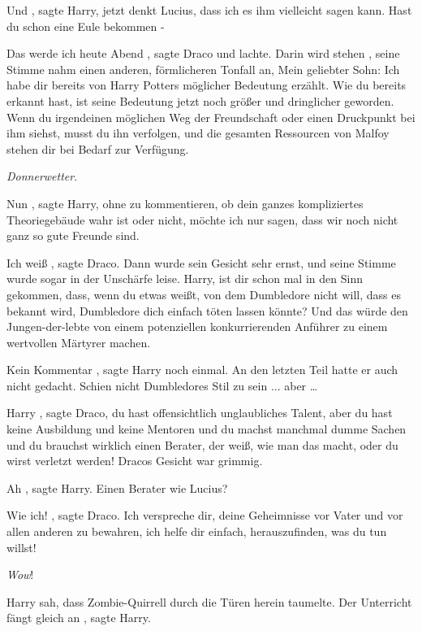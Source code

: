 \glqq Und\grqq{} , sagte Harry, \glqq jetzt denkt Lucius, dass ich es ihm
vielleicht sagen kann. Hast du schon eine Eule bekommen -\grqq{}

\glqq Das werde ich heute Abend\grqq{} , sagte Draco und lachte. \glqq Darin
wird stehen\grqq{} , seine Stimme nahm einen anderen, förmlicheren Tonfall an,
\glqq Mein geliebter Sohn: Ich habe dir bereits von Harry Potters möglicher
Bedeutung erzählt. Wie du bereits erkannt hast, ist seine Bedeutung jetzt noch
größer und dringlicher geworden. Wenn du irgendeinen möglichen Weg der
Freundschaft oder einen Druckpunkt bei ihm siehst, musst du ihn verfolgen, und
die gesamten Ressourcen von Malfoy stehen dir bei Bedarf zur Verfügung.\grqq{}

\emph{Donnerwetter}.

\glqq Nun\grqq{} , sagte Harry, \glqq ohne zu kommentieren, ob dein ganzes
kompliziertes Theoriegebäude wahr ist oder nicht, möchte ich nur sagen, dass wir
noch nicht ganz so gute Freunde sind.\grqq{}

\glqq Ich weiß\grqq{} , sagte Draco. Dann wurde sein Gesicht sehr ernst, und
seine Stimme wurde sogar in der Unschärfe leise. \glqq Harry, ist dir schon mal
in den Sinn gekommen, dass, wenn du etwas weißt, von dem Dumbledore nicht will,
dass es bekannt wird, Dumbledore dich einfach töten lassen könnte? Und das würde
den Jungen-der-lebte von einem potenziellen konkurrierenden Anführer zu einem
wertvollen Märtyrer machen.\grqq{}

\glqq Kein Kommentar\grqq{} , sagte Harry noch einmal. An den letzten Teil hatte
er auch nicht gedacht. Schien nicht Dumbledores Stil zu sein ... aber …

\glqq Harry\grqq{} , sagte Draco, \glqq du hast offensichtlich unglaubliches
Talent, aber du hast keine Ausbildung und keine Mentoren und du machst manchmal
dumme Sachen und du brauchst wirklich einen Berater, der weiß, wie man das
macht, oder du wirst verletzt werden!\grqq{} Dracos Gesicht war grimmig.

\glqq Ah\grqq{} , sagte Harry. \glqq Einen Berater wie Lucius?\grqq{}

\glqq Wie ich!\grqq{} , sagte Draco. \glqq Ich verspreche dir, deine Geheimnisse
vor Vater und vor allen anderen zu bewahren, ich helfe dir einfach,
herauszufinden, was du tun willst!\grqq{}

\emph{Wow}!

Harry sah, dass Zombie-Quirrell durch die Türen herein taumelte. \glqq Der
Unterricht fängt gleich an\grqq{} , sagte Harry.

